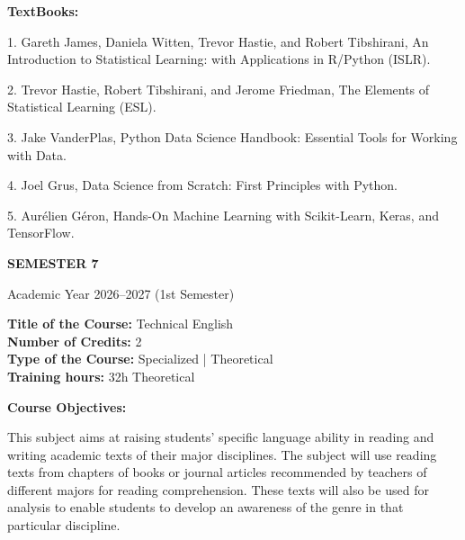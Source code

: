 \documentclass[12pt,a4paper]{article}
\begin{document}
\textbf{TextBooks:}\par\vspace{2pt}
1. Gareth James, Daniela Witten, Trevor Hastie, and Robert Tibshirani, An Introduction to Statistical Learning: with Applications in R/Python (ISLR).\par
2. Trevor Hastie, Robert Tibshirani, and Jerome Friedman, The Elements of Statistical Learning (ESL).\par
3. Jake VanderPlas, Python Data Science Handbook: Essential Tools for Working with Data.\par
4. Joel Grus, Data Science from Scratch: First Principles with Python.\par
5. Aurélien Géron, Hands-On Machine Learning with Scikit-Learn, Keras, and TensorFlow.\par
\vspace{4pt}

\newpage
\vspace*{\fill}
\begin{center}
  {\fontsize{28pt}{34pt}\selectfont \textbf{SEMESTER 7}}\par\vspace{12pt}
  {\fontsize{13pt}{17pt}\selectfont Academic Year 2026–2027 (1st Semester)}
\end{center}
\vspace*{\fill}

\newpage
\textbf{Title of the Course:} Technical English\\
\textbf{Number of Credits:} 2\\
\textbf{Type of the Course:} Specialized | Theoretical\\
\textbf{Training hours:} 32h Theoretical\par\vspace{4pt}
\textbf{Course Objectives:}\par\vspace{2pt}
This subject aims at raising students’ specific language ability in reading and writing academic
texts of their major disciplines. The subject will use reading texts from chapters of books or journal
articles recommended by teachers of different majors for reading comprehension. These texts will
also be used for analysis to enable students to develop an awareness of the genre in that particular
discipline.\par\vspace{4pt}
\end{document}
